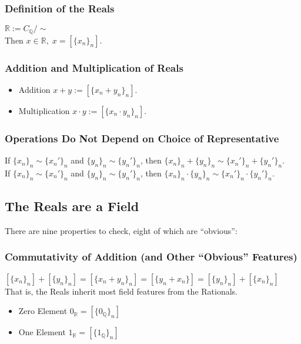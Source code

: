 \documentclass[11pt]{article}
\newcommand{\0}{\emptyset}
\newcommand{\Q}{\mathbb{Q}}
\newcommand{\R}{\mathbb{R}}
\begin{document}
\subsubsection*{Definition of the Reals}
\label{sec:orga512e3a}
\(\R:=C_{\Q}/\sim\)\\[0pt]
Then \(x\in\R,\;x=[\{x_{n}\}_{n}]\).\\[0pt]
\subsubsection*{Addition and Multiplication of Reals}
\label{sec:org29b1083}
\begin{itemize}
\item Addition
\label{sec:org8a1b1ea}
\(x+y:=[\{x_{n}+y_{n}\}_{n}]\).\\[0pt]
\item Multiplication
\label{sec:orgbc91f25}
\(x\cdot y:=[\{x_{n}\cdot y_{n}\}_{n}]\).\\[0pt]
\end{itemize}
\subsubsection*{Operations Do Not Depend on Choice of Representative}
\label{sec:org221cde3}
If \(\{x_{n}\}_{n}\sim\{x_{n}'\}_{n}\) and \(\{y_{n}\}_{n}\sim\{y_{n}'\}_{n}\), then \(\{x_{n}\}_{n}+\{y_{n}\}_{n}\sim\{x_{n}'\}_{n}+\{y_{n}'\}_{n}\).\\[0pt]
If \(\{x_{n}\}_{n}\sim\{x_{n}'\}_{n}\) and \(\{y_{n}\}_{n}\sim\{y_{n}'\}_{n}\), then \(\{x_{n}\}_{n}\cdot \{y_{n}\}_{n}\sim\{x_{n}'\}_{n}\cdot\{y_{n}'\}_{n}\).\\[0pt]
\subsection*{The Reals are a Field}
\label{sec:org6714486}
There are nine properties to check, eight of which are ``obvious'':\\[0pt]
\subsubsection*{Commutativity of Addition (and Other ``Obvious'' Features)}
\label{sec:org1615017}
\([\{x_{n}\}_{n}]+[\{y_{n}\}_{n}]=[\{x_{n}+y_{n}\}_{n}]=[\{y_{n}+x_{n}\}]=[\{y_{n}\}_{n}]+[\{x_{n}\}_{n}]\)\\[0pt]
That is, the Reals inherit most field features from the Rationals.\\[0pt]
\begin{itemize}
\item Zero Element
\label{sec:org5b6bcf7}
\(0_{\R}=[\{0_{\Q}\}_{n}]\)\\[0pt]
\item One Element
\label{sec:orge1b50d5}
\(1_{\R}=[\{1_{\Q}\}_{n}]\)\\[0pt]
\end{itemize}
\end{document}
